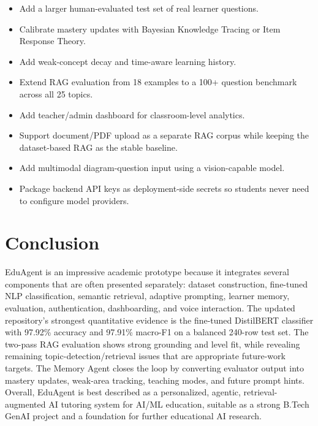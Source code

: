 \documentclass[11pt,a4paper]{article}
\begin{document}
\begin{itemize}
    \item Add a larger human-evaluated test set of real learner questions.
    \item Calibrate mastery updates with Bayesian Knowledge Tracing or Item Response Theory.
    \item Add weak-concept decay and time-aware learning history.
    \item Extend RAG evaluation from 18 examples to a 100+ question benchmark across all 25 topics.
    \item Add teacher/admin dashboard for classroom-level analytics.
    \item Support document/PDF upload as a separate RAG corpus while keeping the dataset-based RAG as the stable baseline.
    \item Add multimodal diagram-question input using a vision-capable model.
    \item Package backend API keys as deployment-side secrets so students never need to configure model providers.
\end{itemize}

\section{Conclusion}

EduAgent is an impressive academic prototype because it integrates several components that are often presented separately: dataset construction, fine-tuned NLP classification, semantic retrieval, adaptive prompting, learner memory, evaluation, authentication, dashboarding, and voice interaction. The updated repository's strongest quantitative evidence is the fine-tuned DistilBERT classifier with 97.92\% accuracy and 97.91\% macro-F1 on a balanced 240-row test set. The two-pass RAG evaluation shows strong grounding and level fit, while revealing remaining topic-detection/retrieval issues that are appropriate future-work targets. The Memory Agent closes the loop by converting evaluator output into mastery updates, weak-area tracking, teaching modes, and future prompt hints. Overall, EduAgent is best described as a personalized, agentic, retrieval-augmented AI tutoring system for AI/ML education, suitable as a strong B.Tech GenAI project and a foundation for further educational AI research.

\newpage
\appendix

\end{document}
